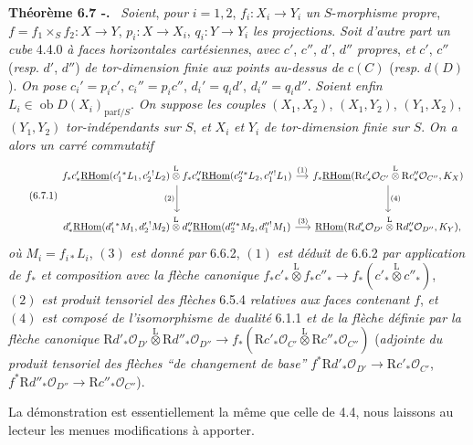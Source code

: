 \documentclass[11pt]{article}
\providecommand{\cO}{\mathcal{O}}
\newenvironment{statement}[1]{\par\medskip\noindent\textbf{#1.}\ }{\par\medskip}
\newcommand{\R}{\mathrm{R}}\newcommand{\RHomCore}{\mathrm{RHom}}
\providecommand{\RHom}{\RHomCore}
\providecommand{\uRHom}{\underline{\RHom}}
\providecommand{\RHom}{\RHomCore}
\providecommand{\RHom}{\R\mathcal{H}om}
\providecommand{\R}{\mathrm R}
\providecommand{\RHom}{\RHomCore}
\begin{document}
\begin{statement}{Théorème 6.7 -}
\emph{Soient}, \emph{pour} $i=1,2$, $f_i:X_i\to Y_i$ \emph{un} $S$-\emph{morphisme propre}, $f=f_1\times_Sf_2:X\to Y$, $p_i:X\to X_i$, $q_i:Y\to Y_i$ \emph{les projections}. \emph{Soit d'autre part un cube} 4.4.0 \emph{à faces horizontales cartésiennes}, \emph{avec} $c'$, $c''$, $d'$, $d''$ \emph{propres}, \emph{et} $c'$, $c''$ (\emph{resp}. $d'$, $d''$) \emph{de tor-dimension finie aux points au-dessus de} $c(C)$ (\emph{resp}. $d(D)$). \emph{On pose} $c_i'=p_ic'$, $c_i''=p_ic''$, $d_i'=q_id'$, $d_i''=q_id''$. \emph{Soient enfin} $L_i\in\operatorname{ob}D(X_i)_{\mathrm{parf}/S}$. \emph{On suppose les couples} $(X_1,X_2)$, $(X_1,Y_2)$, $(Y_1,X_2)$, $(Y_1,Y_2)$ \emph{tor-indépendants sur} $S$, \emph{et} $X_i$ \emph{et} $Y_i$ \emph{de tor-dimension finie sur} $S$. \emph{On a alors un carré commutatif}
\begin{equation}
\tag{6.7.1}
\begin{tikzcd}[column sep=small,row sep=large]
f_*c'_*\uRHom(c_1'{}^*L_1,c_2'{}^!L_2)\overset{\mathrm{L}}{\otimes} f_*c''_*\uRHom(c_2''{}^*L_2,c_1''{}^!L_1) \arrow[r,"(1)"] \arrow[d,"(2)"']
& f_*\uRHom(\R c'_*\cO_{C'}\overset{\mathrm{L}}{\otimes}\R c''_*\cO_{C''},K_X) \arrow[d,"(4)"] \\
d'_*\uRHom(d_1'{}^*M_1,d_2'{}^!M_2)\overset{\mathrm{L}}{\otimes} d''_*\uRHom(d_2''{}^*M_2,d_1''{}^!M_1) \arrow[r,"(3)"]
& \uRHom(\R d'_*\cO_{D'}\overset{\mathrm{L}}{\otimes}\R d''_*\cO_{D''},K_Y),
\end{tikzcd}
\end{equation}
\emph{où} $M_i=f_{i*}L_i$, $(3)$ \emph{est donné par} 6.6.2, $(1)$ \emph{est déduit de} 6.6.2 \emph{par application de} $f_*$ \emph{et composition avec la flèche canonique} $f_*c'_*\overset{\mathrm{L}}{\otimes} f_*c''_*\to f_*(c'_*\overset{\mathrm{L}}{\otimes} c''_*)$, $(2)$ \emph{est produit tensoriel des flèches} 6.5.4 \emph{relatives aux faces contenant} $f$, \emph{et} $(4)$ \emph{est composé de l'isomorphisme de dualité} 6.1.1 \emph{et de la flèche définie par la flèche canonique} $\R d'_*\cO_{D'}\overset{\mathrm{L}}{\otimes}\R d''_*\cO_{D''}\longrightarrow f_*(\R c'_*\cO_{C'}\overset{\mathrm{L}}{\otimes}\R c''_*\cO_{C''})$ (\emph{adjointe du produit tensoriel des flèches ``de changement de base''} $f^*\R d'_*\cO_{D'}\to \R c'_*\cO_{C'}$, $f^*\R d''_*\cO_{D''}\to \R c''_*\cO_{C''}$).
\end{statement}

La démonstration est essentiellement la même que celle de 4.4, nous laissons au lecteur les menues modifications à apporter.
\end{document}
